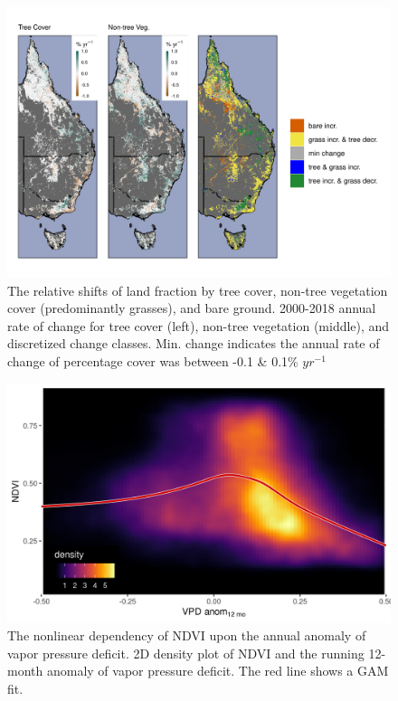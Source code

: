 \documentclass[gc, manuscript]{copernicus}
\begin{document}
\clearpage
\begin{figure}
\includegraphics[width=14cm]{../../figures/appendix-A/SM_Fig10_EOz_map_delta_treecover_nontreeVegcover} \caption{The relative shifts of land fraction by tree cover, non-tree vegetation cover (predominantly grasses), and bare ground. 2000-2018 annual rate of change for tree cover (left), non-tree vegetation (middle), and discretized change classes. Min. change indicates the annual rate of change of percentage cover was between -0.1 \& 0.1\% $yr^{-1}$}\label{fig:FigA10}
\end{figure}
\clearpage

\clearpage
\begin{figure}
\includegraphics[width=14cm]{../../figures/appendix-A/SM_Fig11_vpdanom12mo_ndvi_2d_density} \caption{The nonlinear dependency of NDVI upon the annual anomaly of vapor pressure deficit. 2D density plot of NDVI and the running 12-month anomaly of vapor pressure deficit. The red line shows a GAM fit.}\label{fig:FigA11}
\end{figure}
\clearpage
\end{document}
